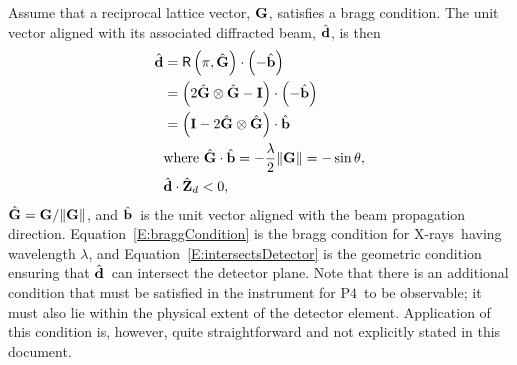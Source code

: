 \documentclass[12pt,letterpaper,final]{amsart}
\newcommand{\mbm}[1]{\ensuremath{\mbox{\boldmath$#1$}}}
\newcommand{\gvec}{\ensuremath{\mbm{\mathrm{G}}}}
\newcommand{\ghat}{\ensuremath{\hat{\mbm{\mathrm{G}}}}}
\newcommand{\bhat}{\ensuremath{\hat{\mbm{\mathrm{b}}}}}
\newcommand{\dhat}{\ensuremath{\hat{\mbm{\mathrm{d}}}}}
\newcommand{\eye}{\ensuremath{\mbm{\mathrm{I}}}}
\newcommand{\Pfour}{\ensuremath{\mathrm{P4}}}
\newcommand{\Zd}{\ensuremath{\hat{\mbm{\mathrm{Z}}}_d}}
\newcommand{\eqnref}[1]{Equation~\ref{#1}}
\newcommand{\xrays}{X-rays}
\begin{document}
Assume that a reciprocal lattice vector, \gvec, satisfies a bragg condition.  The unit vector aligned with its associated diffracted beam, \dhat, is then
\begin{align}
\dhat &= \mathsf{R}\left(\pi, \ghat\right)\cdot\left(-\bhat\right) \nonumber\\
      &= \left(2\ghat\otimes\ghat - \eye\right)\cdot\left(-\bhat\right) \nonumber\\
      &= \left(\eye - 2\ghat\otimes\ghat\right)\cdot\bhat \label{E:dhat}\\
      & \mbox{where } \ghat\cdot\bhat = -\frac{\lambda}{2}\|\gvec\| = -\sin{\theta},  \label{E:braggCondition}\\
      & \dhat\cdot\Zd < 0,  \label{E:intersectsDetector}
\end{align}
$\ghat=\gvec / \|\gvec\|$, and \bhat\ is the unit vector aligned with the beam propagation direction.  \eqnref{E:braggCondition} is the bragg condition for \xrays\ having wavelength $\lambda$, and \eqnref{E:intersectsDetector} is the geometric condition ensuring that \dhat\ can intersect the detector plane.  Note that there is an additional condition that must be satisfied in the instrument for \Pfour\ to be observable; it must also lie within the physical extent of the detector element.  Application of this condition is, however, quite straightforward and not explicitly stated in this document.
\end{document}
